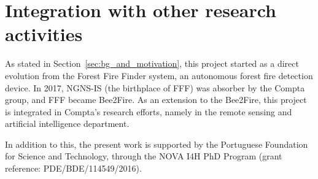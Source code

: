 \section{Integration with other research activities}%
\label{sec:integration_with_other_research_activities}

As stated in Section~\ref{sec:bg_and_motivation}, this project started
as a direct evolution from the Forest Fire Finder system, an autonomous
forest fire detection device. In 2017, NGNS-IS (the birthplace of
\gls{FFF}) was absorber by the Compta group, and \gls{FFF} became
Bee2Fire. As an extension to the Bee2Fire, this project is integrated in
Compta's research efforts, namely in the remote sensing and artificial
intelligence department. 

In addition to this, the present work is supported by the Portuguese
Foundation for Science and Technology, through the NOVA I4H PhD Program
(grant reference: PDE/BDE/114549/2016).






